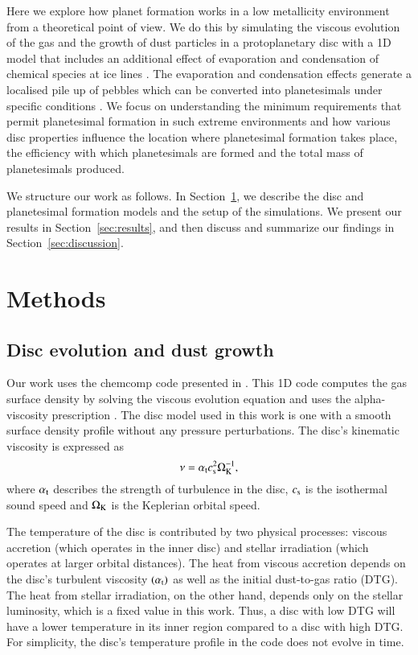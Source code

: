 \documentclass{aa}
\begin{document}
Here we explore how planet formation works in a low metallicity environment from a theoretical point of view. We do this by simulating the viscous evolution of the gas and the growth of dust particles in a protoplanetary disc with a 1D model that includes an additional effect of evaporation and condensation of chemical species at ice lines \citep{SchneiderBitsch2021}. The evaporation and condensation effects generate a localised pile up of pebbles which can be converted into planetesimals under specific conditions \citep{DrazkowskaAlibert2017}. We focus on understanding the minimum requirements that permit planetesimal formation in such extreme environments and how various disc properties influence the location where planetesimal formation takes place, the efficiency with which planetesimals are formed and the total mass of planetesimals produced. 

We structure our work as follows. In Section~\ref{sec:methods}, we describe the disc and planetesimal formation models and the setup of the simulations. We present our results in Section~\ref{sec:results}, and then discuss and summarize our findings in Section~\ref{sec:discussion}.

\section{Methods}\label{sec:methods}
\subsection{Disc evolution and dust growth}
Our work uses the chemcomp code presented in \cite{SchneiderBitsch2021}. This 1D code computes the gas surface density by solving the viscous evolution equation \citep{LyndenBellPringle1974} and uses the alpha-viscosity prescription \citep{ShakuraSunyaev1073}.  The disc model used in this work is one with a smooth surface density profile without any pressure perturbations. The disc’s kinematic viscosity is expressed as
\begin{equation}
    \nu = \alpha_{\rm t} c_{\rm s}^2 \Omega_{\rm K}^{-1},    
\end{equation}
where $\alpha_{\rm t}$ describes the strength of turbulence in the disc, $c_{\rm s}$ is the isothermal sound speed and $\Omega_{\rm K}$ is the Keplerian orbital speed.

The temperature of the disc is contributed by two physical processes: viscous accretion (which operates in the inner disc) and stellar irradiation (which operates at larger orbital distances). The heat from viscous accretion depends on the disc's turbulent viscosity $(\alpha_{\rm t})$ as well as the initial dust-to-gas ratio (DTG). The heat from stellar irradiation, on the other hand, depends only on the stellar luminosity, which is a fixed value in this work. Thus, a disc with low DTG will have a lower temperature in its inner region compared to a disc with high DTG. For simplicity, the disc's temperature profile in the code does not evolve in time.
\end{document}
